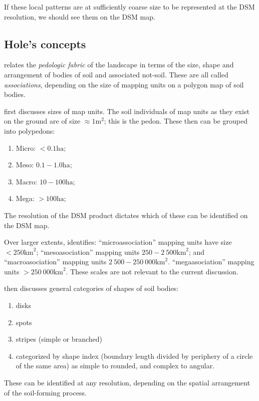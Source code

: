 \documentclass[soil, manuscript]{copernicus}
\begin{document}
If these local patterns are at sufficiently coarse size to be represented at the DSM resolution, we should see them on the DSM map.

\subsection{Hole's concepts}

\citet{holeSoilLandscapeAnalysis1985} relates the \emph{pedologic fabric} of the landscape in terms of the size, shape and arrangement of bodies of soil and associated not-soil.
%
These are all called \emph{associations}, depending on the size of mapping units on a polygon map of soil bodies.
%

\par
\citet[Table 5]{holeApproachLandscapeAnalysis1978} first discusses sizes of map units.
%
The soil individuals of map units as they exist on the ground are of size $\approx 1 \mathrm{m}^2$; this is the pedon.
%
These then can be grouped into polypedons:
%
\begin{enumerate}
\item Micro: $<0.1 \mathrm{ha}$;
\item Meso: $0.1 - 1.0 \mathrm{ha}$;
\item Macro: $10 - 100 \mathrm{ha}$;
\item Mega: $>100 \mathrm{ha}$;
\end{enumerate}
%
The resolution of the DSM product dictates which of these can be identified on the DSM map.

\par
Over larger extents, \citet[Table 5]{holeApproachLandscapeAnalysis1978} identifies:
%
``microassociation'' mapping units have size $<250 \mathrm{km}^2$;
%
``mesoasociation'' mapping units $250-2~500 \mathrm{km}^2$; and
%
``macroasociation'' mapping units  $2~500 - 250~000\mathrm{km}^2$.
%
``megaasociation'' mapping units  $> 250~000\mathrm{km}^2$.
%
These scales are not relevant to the current discussion.

\par
\citet[Figure 5]{holeApproachLandscapeAnalysis1978}  then discusses general categories of shapes of soil bodies:
\begin{enumerate}
\item disks
\item spots
\item stripes (simple or branched)
\item categorized by shape index (boundary length divided by periphery of a circle of the same area) as simple to rounded, and complex to angular.
\end{enumerate}
%
These can be identified at any resolution, depending on the spatial arrangement of the soil-forming process.
\end{document}
